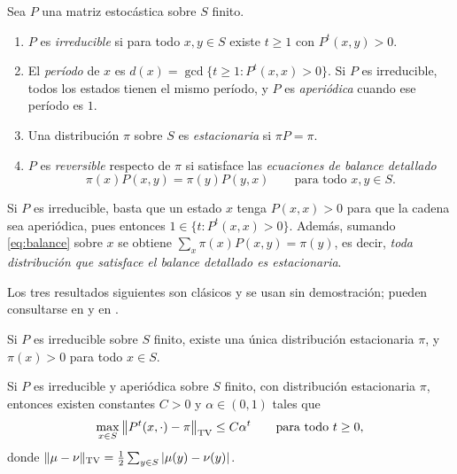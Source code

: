 \begin{definicion}
\label{def:propiedades}
Sea \(P\) una matriz estocástica sobre \(S\) finito.
\begin{enumerate}[label=(\roman*)]
    \item \(P\) es \emph{irreducible} si para todo \(x,y\in S\) existe
    \(t\ge 1\) con \(P^t(x,y)>0\).
    \item El \emph{período} de \(x\) es
    \(d(x)=\gcd\{t\ge 1: P^t(x,x)>0\}\). Si \(P\) es irreducible,
    todos los estados tienen el mismo período, y \(P\) es
    \emph{aperiódica} cuando ese período es \(1\).
    \item Una distribución \(\pi\) sobre \(S\) es \emph{estacionaria}
    si \(\pi P=\pi\).
    \item \(P\) es \emph{reversible} respecto de \(\pi\) si satisface
    las \emph{ecuaciones de balance detallado}
    \begin{equation}
    \label{eq:balance}
    \pi(x)P(x,y)=\pi(y)P(y,x)\qquad\text{para todo } x,y\in S.
    \end{equation}
\end{enumerate}
\end{definicion}

Si \(P\) es irreducible, basta que un estado \(x\) tenga
\(P(x,x)>0\) para que la cadena sea aperiódica, pues entonces
\(1\in\{t: P^t(x,x)>0\}\). Además, sumando \eqref{eq:balance} sobre
\(x\) se obtiene \(\sum_x\pi(x)P(x,y)=\pi(y)\), es decir, \emph{toda
distribución que satisface el balance detallado es estacionaria}.

Los tres resultados siguientes son clásicos y se usan sin
demostración; pueden consultarse en
\citet[caps.~1 y~4]{levin2017} y en \citet[caps.~3 y~4]{bremaud2020}.

\begin{teorema}
\label{teo:unicidad}
Si \(P\) es irreducible sobre \(S\) finito, existe una única
distribución estacionaria \(\pi\), y \(\pi(x)>0\) para todo
\(x\in S\).
\end{teorema}

\begin{teorema}[Convergencia]
\label{teo:convergencia}
Si \(P\) es irreducible y aperiódica sobre \(S\) finito, con
distribución estacionaria \(\pi\), entonces existen constantes
\(C>0\) y \(\alpha\in(0,1)\) tales que
\[
\max_{x\in S}\,\bigl\|P^t(x,\cdot)-\pi\bigr\|_{\mathrm{TV}}\le C\alpha^t
\qquad\text{para todo } t\ge 0,
\]
donde
\(\|\mu-\nu\|_{\mathrm{TV}}=\tfrac12\sum_{y\in S}|\mu(y)-\nu(y)|\).
\end{teorema}


